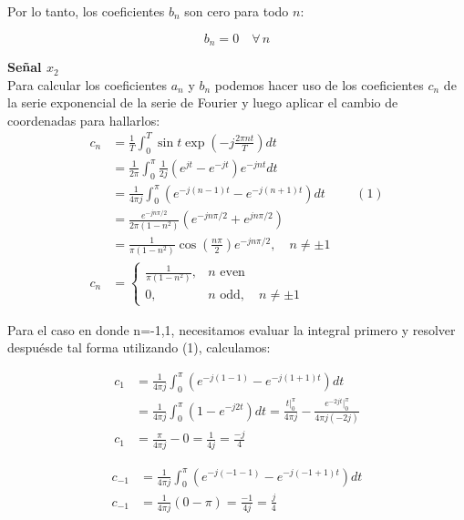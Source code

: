 \documentclass[12pt,a4paper]{report}
\begin{document}
\begin{enumerate}[label=\alph*),left=0pt]
\begin{itemize}[left=0pt]
  Por lo tanto, los coeficientes \(b_n\) son cero para todo \(n\):
  
  $$
  b_n = 0 \quad \forall \, n
  $$
  

	\textbf{Señal $x_2$}\\

Para calcular los coeficientes $a_n$ y $b_n$ podemos hacer uso de los coeficientes $c_n$ de la serie exponencial de la serie de Fourier y luego aplicar el cambio de coordenadas para hallarlos:
            $$
            \begin{aligned}
                c_n &= \frac{1}{T} \int_0^T \sin t \exp\left(-j\frac{2\pi n t}{T}\right) dt\\
                &= \frac{1}{2\pi} \int_0^{\pi} \frac{1}{2j}\left(e^{jt} - e^{-jt}\right) e^{-jnt} dt\\
                &= \frac{1}{4\pi j} \int_0^{\pi} \left(e^{-j(n-1)t} - e^{-j(n+1)t}\right) dt \hspace{1cm}(1)\\
                &= \frac{e^{-jn\pi/2}}{2\pi(1-n^2)} \left(e^{-jn\pi/2} + e^{jn\pi/2}\right)\\
                & = \frac{1}{\pi(1-n^2)} \cos\left(\frac{n\pi}{2}\right)e^{-jn\pi/2}, \quad n \neq \pm 1\\
                c_n &= \begin{cases}
            \frac{1}{\pi(1-n^2)}, & n \text{ even} \\[5pt]
            0, & n \text{ odd}, \quad n \neq \pm 1
            \end{cases}
            \end{aligned}
            $$

       Para el caso en donde n=-1,1, necesitamos evaluar la integral primero y resolver despuésde tal forma utilizando (1), calculamos:

       $$
       \begin{aligned}
       c_1&=\frac{1}{4\pi j}\int_0^\pi(e^{-j(1-1)}-e^{-j(1+1)t})dt\\
       &=\frac{1}{4\pi j}\int^\pi_0 (1-e^{-j2t})dt=\frac{t|^\pi_0}{4\pi j}-\frac{e^{-2jt}|^\pi_0}{4\pi j (-2j)}\\
       c_1&=\frac{\pi}{4\pi j}-0=\frac{1}{4j}=\frac{-j}{4}
       \end{aligned}
       $$
     
       $$
        \begin{aligned}
        c_{-1}&=\frac{1}{4\pi j}\int^\pi_0(e^{-j(-1-1)}-e^{-j(-1+1)t})dt\\
       c_{-1}&=\frac{1}{4\pi j}(0-\pi)=\frac{-1}{4j}=\frac{j}{4}     
        \end{aligned}
       $$


\end{itemize}
\end{enumerate}
\end{document}
